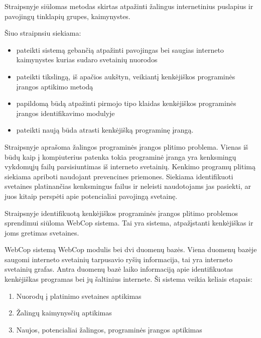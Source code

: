 
Straipsnyje  siūlomas  metodas skirtas atpažinti žalingus internetinius puslapius ir pavojingų tinklapių grupes, kaimynystes.

Šiuo straipnsiu siekiama:
    \begin{itemize}
        \item pateikti sistemą gebančią atpažinti pavojingas bei saugias interneto kaimynystes kurias sudaro svetainių nuorodos
         \item pateikti tikslingą, iš apačios aukštyn, veikiantį kenkėjiškos programinės įrangos aptikimo metodą
         \item papildomą būdą atpažinti pirmojo tipo klaidas kenkėjiškos programinės įrangos identifikavimo modulyje
         \item pateikti naują būda atrasti kenkėjišką programinę įrangą.
    \end{itemize}

Straipsnyje aprašoma žalingos programinės įrangos plitimo problema. Vienas iš būdų kaip į kompiuterius patenka  tokia programinė įranga yra kenksmingų vykdomųjų failų parsisiuntimas iš interneto svetainių. Kenkimo programų plitimą siekiama apriboti naudojant prevencines priemones. Siekiama identifikuoti svetaines platinančias kenksmingus failus ir neleisti naudotojams jas pasiekti, ar juos kitaip perspėti apie potencialiai pavojingą svetainę.


Straipsnyje identifikuotą kenkėjiškos programinės įrangos plitimo problemos sprendimui siūloma WebCop sistema. Tai yra sistema, atpažįstanti kenkėjiškas ir joms gretimas svetaines.

WebCop sistemą WebCop modulis bei dvi duomenų bazės. Viena duomenų bazėje saugomi interneto svetainių tarpusavio ryšių informacija, tai yra interneto svetainių grafas. Antra duomenų bazė laiko informaciją apie identifikuotas kenkėjiškas programas bei jų šaltinius internete. Ši sistema veikia keliais etapais:
    \begin{enumerate}[label=\arabic*.]
        \item Nuorodų į platinimo svetaines aptikimas
        \item Žalingų kaimynysčių aptikimas
        \item Naujos, potencialiai žalingos, programinės įrangos aptikimas
    \end{enumerate}

